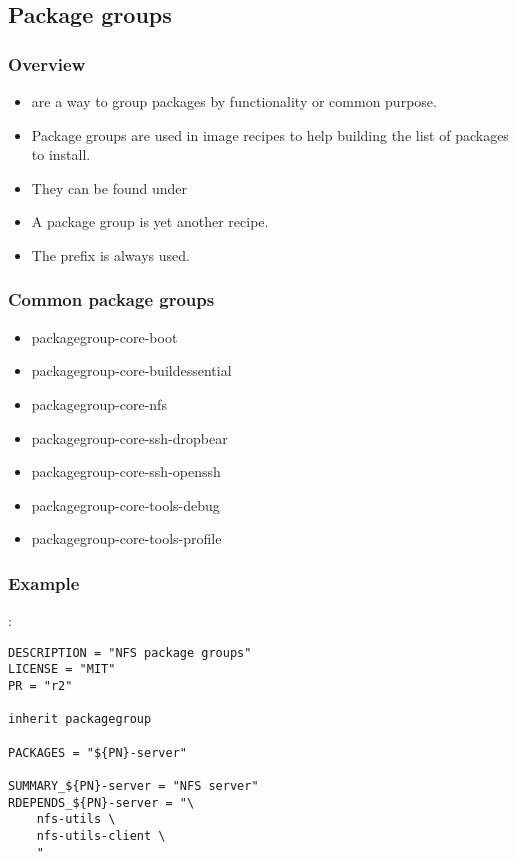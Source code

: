 \subsection{Package groups}

\begin{frame}
  \frametitle{Overview}
  \begin{itemize}
    \item {} are a way to group packages by
      functionality or common purpose.
    \item Package groups are used in image recipes to help building
      the list of packages to install.
    \item They can be found under
    \item A package group is yet another recipe.
    \item The prefix  is always used.
  \end{itemize}
\end{frame}

\begin{frame}
  \frametitle{Common package groups}
  \begin{itemize}
    \item packagegroup-core-boot
    \item packagegroup-core-buildessential
    \item packagegroup-core-nfs
    \item packagegroup-core-ssh-dropbear
    \item packagegroup-core-ssh-openssh
    \item packagegroup-core-tools-debug
    \item packagegroup-core-tools-profile
  \end{itemize}
\end{frame}

\begin{frame}[fragile]
  \frametitle{Example}
  :
  \begin{block}{}
    \begin{verbatim}
DESCRIPTION = "NFS package groups"
LICENSE = "MIT"
PR = "r2"

inherit packagegroup

PACKAGES = "${PN}-server"

SUMMARY_${PN}-server = "NFS server"
RDEPENDS_${PN}-server = "\
    nfs-utils \
    nfs-utils-client \
    "
    \end{verbatim}
  \end{block}
\end{frame}
